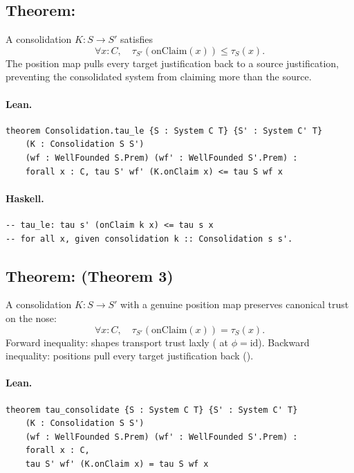 \documentclass[11pt,a4paper]{article}
\begin{document}
\subsection{Theorem: }

\begin{thm}
A consolidation $K : S \to S'$ satisfies
\[
  \forall x : C,\quad \tau_{S'}(\mathrm{onClaim}(x)) \le \tau_S(x).
\]
The position map pulls every target justification back to a source
justification, preventing the consolidated system from claiming more than
the source.
\end{thm}

\paragraph{Lean.}
\begin{lstlisting}[style=lean]
theorem Consolidation.tau_le {S : System C T} {S' : System C' T}
    (K : Consolidation S S')
    (wf : WellFounded S.Prem) (wf' : WellFounded S'.Prem) :
    forall x : C, tau S' wf' (K.onClaim x) <= tau S wf x
\end{lstlisting}

\paragraph{Haskell.}
\begin{lstlisting}[style=haskell]
-- tau_le: tau s' (onClaim k x) <= tau s x
-- for all x, given consolidation k :: Consolidation s s'.
\end{lstlisting}


\subsection{Theorem:  (Theorem 3)}

\begin{thm}
A consolidation $K : S \to S'$ with a genuine position map preserves
canonical trust on the nose:
\[
  \forall x : C,\quad \tau_{S'}(\mathrm{onClaim}(x)) = \tau_S(x).
\]
Forward inequality: shapes transport trust laxly ( at
$\phi = \mathrm{id}$).  Backward inequality: positions pull every target
justification back ().
\end{thm}

\paragraph{Lean.}
\begin{lstlisting}[style=lean]
theorem tau_consolidate {S : System C T} {S' : System C' T}
    (K : Consolidation S S')
    (wf : WellFounded S.Prem) (wf' : WellFounded S'.Prem) :
    forall x : C,
    tau S' wf' (K.onClaim x) = tau S wf x
\end{lstlisting}
\end{document}
